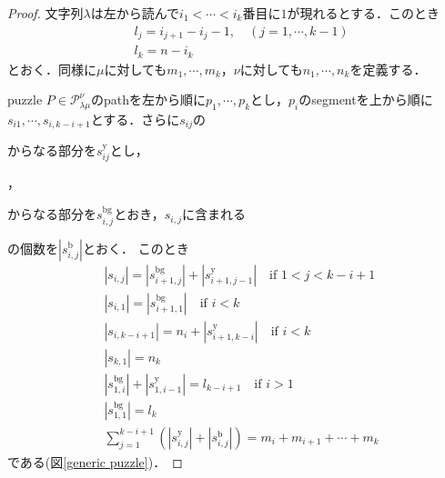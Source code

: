 \begin{proof}
  文字列$\lambda$は左から読んで$i_1<\cdots<i_k$番目に$1$が現れるとする．このとき
  \begin{align*}
    &l_j = i_{j+1} - i_{j} - 1,\quad (j=1,\cdots,k-1)\\
    &l_k = n - i_k
  \end{align*}
  とおく．同様に$\mu$に対しても$m_1,\cdots,m_{k}$，$\nu$に対しても$n_1,\cdots,n_{k}$を定義する．

  puzzle $P\in\mathcal{P}^\nu_{\lambda\mu}$のpathを左から順に$p_1,\cdots,p_k$とし，$p_i$のsegmentを上から順に$s_{i1},\cdots,s_{i,k-i+1}$とする．さらに$s_{ij}$の
  からなる部分を$s_{ij}^{\text{y}}$とし，
  ，
  からなる部分を$s_{i,j}^{\text{bg}}$とおき，$s_{i,j}$に含まれる
  の個数を$|s_{i,j}^{\text{b}}|$とおく．
  このとき
  \begin{align}
    &|s_{i,j}| = |s_{i+1,j}^{\text{bg}}| + |s_{i+1,j-1}^{\text{y}}| \quad \text{if } 1 < j < k-i+1\label{segment condition 1}\\
    &|s_{i,1}| = |s_{i+1,1}^{\text{bg}}|\label{segment condition 2}\quad \text{if } i < k\\
    &|s_{i,k-i+1}| = n_i + |s_{i+1, k-i}^{\text{y}}| \quad \text{if } i < k\label{segment condition 3}\\
    &|s_{k,1}| = n_k\label{segment condition 4}\\
    &|s_{1,i}^{\text{bg}}| + |s_{1,i-1}^{\text{y}}| = l_{k-i+1}\quad \text{if } i > 1\label{segment condition 5}\\
    &|s_{1,1}^{\text{bg}}| = l_{k}\label{segment condition 6}\\
    &\sum_{j=1}^{k-i+1}(|s_{i,j}^{\text{y}}|+|s_{i,j}^{\text{b}}|) = m_{i}+m_{i+1}+\cdots+m_{k}\label{segment condition 7}
  \end{align}
  である(図\ref{generic puzzle})．


\end{proof}
